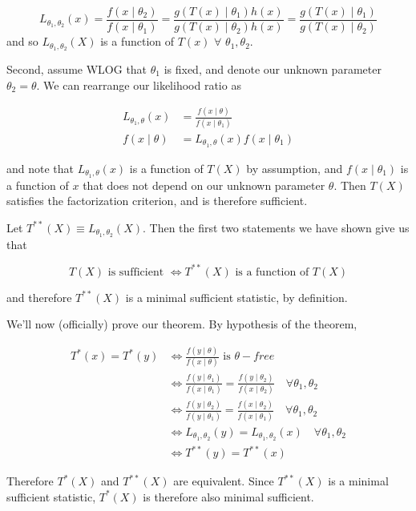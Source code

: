 \documentclass[
  letterpaper,
  DIV=11,
  numbers=noendperiod]{scrreprt}
\begin{document}
\[
L_{\theta_1, \theta_2}(x) = \frac{f(x \mid \theta_2)}{f(x \mid \theta_1)} = \frac{g(T(x) \mid \theta_1)h(x)}{g(T(x) \mid \theta_2)h(x)} = \frac{g(T(x) \mid \theta_1)}{g(T(x) \mid \theta_2)}
\] and so \(L_{\theta_1, \theta_2}(X)\) is a function of \(T(x)\)
\(\forall\) \(\theta_1, \theta_2\).

Second, assume WLOG that \(\theta_1\) is fixed, and denote our unknown
parameter \(\theta_2 = \theta\). We can rearrange our likelihood ratio
as

\begin{align*}
    L_{\theta_1, \theta}(x) & = \frac{f(x \mid \theta)}{f(x \mid \theta_1)} \\
    f(x \mid \theta) & = L_{\theta_1, \theta}(x) f(x \mid \theta_1) 
\end{align*}

and note that \(L_{\theta_1, \theta}(x)\) is a function of \(T(X)\) by
assumption, and \(f(x \mid \theta_1)\) is a function of \(x\) that does
not depend on our unknown parameter \(\theta\). Then \(T(X)\) satisfies
the factorization criterion, and is therefore sufficient.

Let \(T^{**}(X) \equiv L_{\theta_1, \theta_2}(X)\). Then the first two
statements we have shown give us that

\[
T(X) \text{ is sufficient } \iff T^{**}(X) \text{ is a function of } T(X)
\]

and therefore \(T^{**}(X)\) is a minimal sufficient statistic, by
definition.

We'll now (officially) prove our theorem. By hypothesis of the theorem,

\begin{align*}
    T^*(x) = T^*(y) & \iff \frac{f(y \mid \theta)}{f(x \mid \theta)} \text{ is } \theta-free \\
    & \iff \frac{f(y \mid \theta_1)}{f(x \mid \theta_1)} = \frac{f(y \mid \theta_2)}{f(x \mid \theta_2)} \quad \forall \theta_1, \theta_2 \\
    & \iff \frac{f(y \mid \theta_2)}{f(y \mid \theta_1)} = \frac{f(x \mid \theta_2)}{f(x \mid \theta_1)} \quad \forall \theta_1, \theta_2 \\
    & \iff L_{\theta_1, \theta_2}(y) = L_{\theta_1, \theta_2} (x) \quad \forall \theta_1, \theta_2 \\
    & \iff T^{**}(y) = T^{**}(x)
\end{align*}

Therefore \(T^*(X)\) and \(T^{**}(X)\) are equivalent. Since
\(T^{**}(X)\) is a minimal sufficient statistic, \(T^*(X)\) is therefore
also minimal sufficient.
\end{document}
